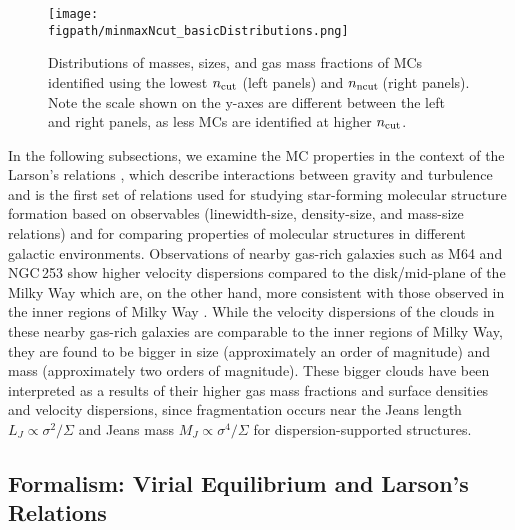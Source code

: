 \IfFileExists{emulateapjlegacy.cls}{\documentclass[iop]{emulateapjlegacy}}{\documentclass[iop]{emulateapj}}
\newcommand{\AP}[1]{({\bf \color{apcolor} AP: #1})}
\begin{document}
\begin{figure*}[htbp]
\centering
\texttt{[image: \\figpath/minmaxNcut\_basicDistributions.png]}
\caption{
Distributions of masses, sizes, and gas mass fractions of MCs identified using 
the lowest $n_{\rm cut}$ (left panels) and $n_{\rm ncut}$\,\cc (right panels).
Note the scale shown on the y-axes are different between the left and right panels, as less MCs are identified 
at higher $n_{\rm cut}$.
\label{fig:dist}}
\end{figure*}

In the following subsections,
we examine the MC properties in the context of the Larson's relations \citep{Larson81a}, which
describe interactions between gravity and turbulence and is the first set of 
relations used for studying star-forming molecular structure formation based on observables (linewidth-size,
density-size, and mass-size relations) and for comparing properties of molecular structures
in different galactic environments.
Observations of nearby gas-rich galaxies such as M64 and NGC\,253
show higher velocity dispersions compared
to the disk/mid-plane of the Milky Way which are, on the other hand,
more consistent with those observed in the inner regions of
Milky Way \citep{Oka01a, Rosolowsky05a, Heyer09a, Leroy15a}.  %
While the velocity dispersions of the clouds in these nearby gas-rich galaxies are comparable
to the inner regions of Milky Way, they are found to be bigger in size (approximately
an order of magnitude) and mass (approximately two orders of magnitude).
These bigger clouds have been interpreted as a results of their higher gas mass fractions and
surface densities and velocity dispersions, since
fragmentation occurs near the Jeans length $L_J\propto\sigma^2/\Sigma$
and Jeans mass $M_J\propto\sigma^4/\Sigma$
for dispersion-supported structures.

\subsection{Formalism: Virial Equilibrium and Larson's Relations}  \label{sec:PVE}
\end{document}
